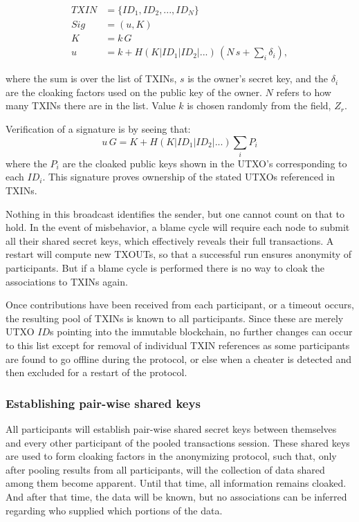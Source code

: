 \documentclass[a4paper, 10pt, conference]{ieeeconf}
\begin{document}
\begin{align*}
TXIN &= \{ID_1, ID_2, ..., ID_N\}\\
Sig &= (u, K)\\
K &= k \, G \\
u &= k + H(K | ID_1 | ID_2 | ...) \, (N \, s + \sum_i{\delta_i}),
\end{align*}

where the sum is over the list of TXINs, $s$ is the owner's secret key, and the $\delta_i$ are the cloaking factors used on the public key of the owner. $N$ refers to how many TXINs there are in the list. Value $k$ is chosen randomly from the field, $Z_r$. 

Verification of a signature is by seeing that:
$$u \, G = K + H(K | ID_1 | ID_2 | ...) \sum_i{P_i}$$
where the $P_i$ are the cloaked public keys shown in the UTXO's corresponding to each $ID_i$. This signature proves ownership of the stated UTXOs referenced in TXINs.

Nothing in this broadcast identifies the sender, but one cannot count on that to hold. In the event of misbehavior, a blame cycle will require each node to submit all their shared secret keys, which effectively reveals their full transactions. A restart will compute new TXOUTs, so that a successful run ensures anonymity of participants. But if a blame cycle is performed there is no way to cloak the associations to TXINs again.

Once contributions have been received from each participant, or a timeout occurs, the resulting pool of TXINs is known to all participants. Since these are merely UTXO $ID$s pointing into the immutable blockchain, no further changes can occur to this list except for removal of individual TXIN references as some participants are found to go offline during the protocol, or else when a cheater is detected and then excluded for a restart of the protocol.

\subsubsection{Establishing pair-wise shared keys} All participants will establish pair-wise shared secret keys between themselves and every other participant of the pooled transactions session. These shared keys are used to form cloaking factors in the anonymizing protocol, such that, only after pooling results from all participants, will the collection of data shared among them become apparent. Until that time, all information remains cloaked. And after that time, the data will be known, but no associations can be inferred regarding who supplied which portions of the data. 
\end{document}
